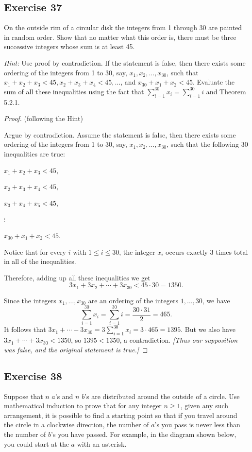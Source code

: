 \documentclass[14pt]{extarticle}
\newcommand{\dps}{\displaystyle}
\begin{document}
\subsection{Exercise 37}
On the outside rim of a circular disk the integers from 1 through 30 are painted in random order. Show that no matter what this order is, there must be three successive integers whose sum is at least 45.

{\it Hint:} Use proof by contradiction. If the statement is false, then there exists some ordering of the integers from 1 to 30, say, $x_1, x_2, \ldots, x_{30}$, such that $x_1 + x_2 + x_3 < 45, x_2 + x_3 + x_4 < 45, \ldots$, and $x_{30} + x_1 + x_2 < 45$. Evaluate the sum of all these inequalities using the fact that $\sum_{i = 1}^{30} x_i = \sum_{i = 1}^{30} i$ and Theorem 5.2.1.

\begin{proof}
(following the Hint)

Argue by contradiction. Assume the statement is false, then there exists some ordering of the integers from 1 to 30, say, $x_1, x_2, \ldots, x_{30}$, such that the following 30 inequalities are true:

$x_1 + x_2 + x_3 < 45$, 

$x_2 + x_3 + x_4 < 45$,

$x_3 + x_4 + x_5 < 45$, 

$\vdots$

$x_{30} + x_1 + x_2 < 45$. 

Notice that for every $i$ with $1 \leq i \leq 30$, the integer $x_i$ occurs exactly 3 times total in all of the inequalities.

Therefore, adding up all these inequalities we get
\[
3x_1 + 3x_2 + \cdots + 3x_{30} < 45 \cdot 30 = 1350.
\]

Since the integers $x_1, \ldots, x_{30}$ are an ordering of the integers $1, \ldots, 30$, we have 
\[
\dps \sum_{i = 1}^{30} x_i = \sum_{i = 1}^{30} i = \frac{30 \cdot 31}{2} = 465.
\] 
It follows that $\dps 3x_1 + \cdots + 3x_{30} = 3\sum_{i = 1}^{30} x_i = 3 \cdot 465 = 1395$. But we also have $3x_1 + \cdots + 3x_{30} < 1350$, so $1395 < 1350$, a contradiction. {\it [Thus our supposition was false, and the original statement is true.]}
\end{proof}

\subsection{Exercise 38}
Suppose that $n$ $a$’s and $n$ $b$’s are distributed around
the outside of a circle. Use mathematical induction to prove that for any integer $n \geq 1$, given any such arrangement, it is possible to find a starting point so that if you travel around the circle in a clockwise direction, the number of $a$’s you pass is never less than the number of $b$’s you have passed. For example, in the diagram shown below, you could start at the $a$ with an asterisk.
\end{document}
